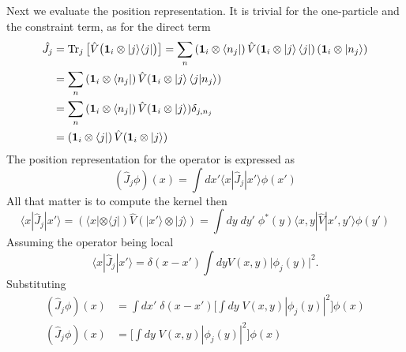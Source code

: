 \documentclass[../../../main.tex]{subfiles}
\begin{document}
Next we evaluate the position representation.
It is trivial for the one-particle and the constraint term, as for the direct term
\begin{align*}
  \hat{J}_j & =  \operatorname{Tr}_j \big[\hat{V}\big(\mathbf{1}_i\otimes |j\rangle\langle j|\big)\big]
  = \sum_n \left( \mathbf{1 }_i \otimes \bra{n_j} \right) \hat{V}(\mathbf{1 }_i \otimes \ket{j}\bra{j}) \left( \mathbf{1 }_i \otimes \ket{n_j} \right) \\
            & = \sum_n \left( \mathbf{1 }_i \otimes \bra{n_j} \right) \hat{V}(\mathbf{1 }_i \otimes \ket{j}\braket{j|n_j})                             \\
            & = \sum_n \left( \mathbf{1 }_i \otimes \bra{n_j} \right) \hat{V}(\mathbf{1 }_i \otimes \ket{j} )\delta_{j,n_j}                            \\
            & = \left( \mathbf{1 }_i \otimes \bra{j} \right) \hat{V}(\mathbf{1 }_i \otimes \ket{j} )
\end{align*}
The position representation for the operator is expressed as
\begin{equation*}
  (\hat{J}_j\phi)(x) = \int dx'\langle x|\hat{J}_j|x'\rangle\phi(x')
\end{equation*}
All that matter is to compute the kernel then
\begin{equation*}
  \langle x|\hat{J}_j|x'\rangle
  = (\langle x|\otimes\langle j|)\hat{V} (|x'\rangle\otimes|j\rangle)
  =  \int dy\;dy'\;\phi^*(y)\langle x,y|\hat{V}|x',y'\rangle\phi(y')
\end{equation*}
Assuming the operator being local
\begin{equation*}
  \langle x|\hat{J}_j|x'\rangle
  =\delta(x-x')\int dyV(x,y)\lvert\phi_j(y)\rvert^2.
\end{equation*}
Substituting
\begin{align*}
  (\hat{J}_j\phi)(x)
   & = \int dx'\;\delta(x-x')\Bigg[\int dy\;V(x,y)|\phi_j(y)|^2\Bigg]\phi(x) \\
  (\hat{J}_j\phi)(x)
   & = \Bigg[\int dy\;V(x,y)|\phi_j(y)|^2\Bigg]\phi(x)
\end{align*}
\end{document}
